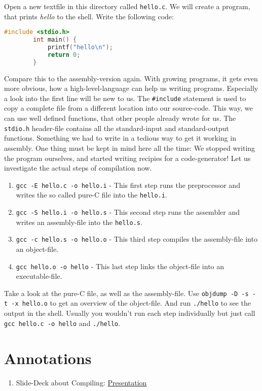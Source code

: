 \documentclass{dcbl/challenge}
\begin{document}
\begin{aufgabe}
    Open a new textfile in this directory called \texttt{hello.c}.
    We will create a program, that prints \textit{hello} to the shell.
    Write the following code:
    \begin{lstlisting}[language={C}, caption={Hello World in C}]
        #include <stdio.h>
        int main() { 
            printf("hello\n"); 
            return 0; 
        }
    \end{lstlisting}
    Compare this to the assembly-version again. 
    With growing programs, it gets even more obvious, how a high-level-language can help us writing programs. 
    Especially a look into the first line will be new to us. 
    The \texttt{\#include} statement is used to copy a complete file from a different location into our source-code. 
    This way, we can use well defined functions, that other people already wrote for us.
    The \texttt{stdio.h} header-file contains all the standard-input and standard-output functions.
    Something we had to write in a tedious way to get it working in assembly.
    One thing must be kept in mind here all the time: We stopped writing the program ourselves, and started writing recipies for a code-generator!
    Let us investigate the actual steps of compilation now.\\
    \begin{enumerate}
        \item \texttt{gcc -E hello.c -o hello.i} - This first step runs the preprocessor and writes the so called pure-C file into the \texttt{hello.i}.
        \item \texttt{gcc -S hello.i -o hello.s} - This second step runs the assembler and writes an assembly-file into the \texttt{hello.s}.
        \item \texttt{gcc -c hello.s -o hello.o} - This third step compiles the assembly-file into an object-file.
        \item \texttt{gcc hello.o -o hello} - This last step links the object-file into an executable-file.
    \end{enumerate}
    Take a look at the pure-C file, as well as the assembly-file.
    Use \texttt{objdump -D -s -t -x hello.o} to get an overview of the object-file.
    And run \texttt{./hello} to see the output in the shell.
    Usually you wouldn't run each step individually but just call \texttt{gcc hello.c -o hello} and \texttt{./hello}.
\end{aufgabe}


\section*{Annotations}
\begin{enumerate}
    \item Slide-Deck about Compiling: \href{https://docs.google.com/presentation/d/1L_ALmHWfUl4o5LmlR57lYcjnFoX_JdS_3fqgFlhNT6s/edit?usp=sharing}{Presentation}
\end{enumerate}
\end{document}
